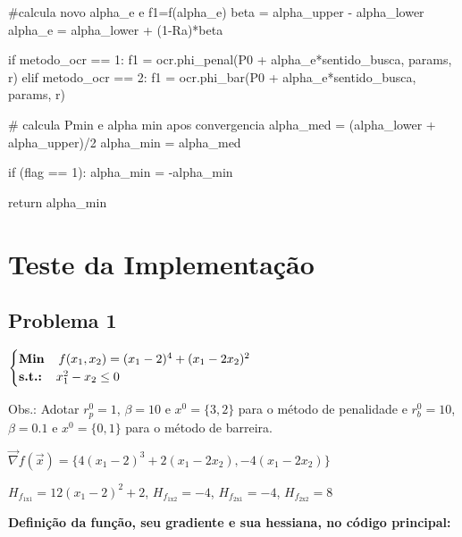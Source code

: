 \documentclass[10pt, a4paper]{article}
\begin{document}
\begin{python}
              #calcula novo alpha_e e f1=f(alpha_e)
              beta = alpha_upper - alpha_lower
              alpha_e = alpha_lower + (1-Ra)*beta
              
              if metodo_ocr == 1:
                  f1 = ocr.phi_penal(P0 + alpha_e*sentido_busca, params, r)
              elif metodo_ocr == 2:
                  f1 = ocr.phi_bar(P0 + alpha_e*sentido_busca, params, r)
              
      # calcula Pmin e alpha min apos convergencia
      alpha_med = (alpha_lower + alpha_upper)/2
      alpha_min = alpha_med
      
      if (flag == 1):
          alpha_min = -alpha_min
      
      return alpha_min
\end{python}


\section{Teste da Implementação}

\subsection{Problema 1}

\begin{center}
  $\begin{cases}
    \textbf{Min} \hspace{4mm}  f(x_1, x_2) = (x_1 - 2)^4 + (x_1 - 2x_2)^2 \\
    \textbf{s.t.:} \hspace{4mm} x_1^2 - x_2 \leq 0
  \end{cases}$
\end{center}
Obs.: Adotar $r_p^0 = 1$, $\beta = 10$ e $x^0 = \{3,2\}$ para o método de penalidade e
$r_b^0 = 10$, $\beta = 0.1$ e $x^0 = \{0,1\}$ para o método de barreira.

\vspace{3mm}
$\overrightarrow{\nabla} f (\overrightarrow{x}) = \{4(x_1 - 2)^3 + 2(x_1 - 2x_2), -4(x_1 - 2x_2)\}$

\vspace{3mm}
$H_{f_{1\text{x}1}} = 12(x_1 - 2)^2 + 2$, \hspace{4mm}
$H_{f_{1\text{x}2}} = -4$, \hspace{4mm}
$H_{f_{2\text{x}1}} = -4$, \hspace{4mm}
$H_{f_{2\text{x}2}} = 8$

\vspace{3mm}
\textbf{Definição da função, seu gradiente e sua hessiana, no código principal:}
\end{document}
